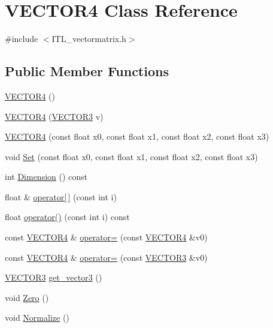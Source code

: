 \hypertarget{classVECTOR4}{
\section{VECTOR4 Class Reference}
\label{classVECTOR4}
}


{\ttfamily \#include $<$ITL\_\-vectormatrix.h$>$}

\subsection*{Public Member Functions}
\begin{DoxyCompactItemize}
\item 
\hyperlink{classVECTOR4_a0fa3ba169814c205b0c415b816efa415}{VECTOR4} ()
\item 
\hyperlink{classVECTOR4_a03f888cfe21db9b688015038a148c2f7}{VECTOR4} (\hyperlink{classVECTOR3}{VECTOR3} v)
\item 
\hyperlink{classVECTOR4_a34f681d3c7082bd127ae8d4445bfc082}{VECTOR4} (const float x0, const float x1, const float x2, const float x3)
\item 
void \hyperlink{classVECTOR4_a7caa8b37c7cd7350c04c66f31fb2d656}{Set} (const float x0, const float x1, const float x2, const float x3)
\item 
int \hyperlink{classVECTOR4_a6a7a49405ccdfcce0d4126f5a70d2514}{Dimension} () const 
\item 
float \& \hyperlink{classVECTOR4_ab1865df5dacd8b2f04a237abf70a57cf}{operator\mbox{[}$\,$\mbox{]}} (const int i)
\item 
float \hyperlink{classVECTOR4_a23c63962e44ac4fbfeca1f3a0d10fea6}{operator()} (const int i) const 
\item 
const \hyperlink{classVECTOR4}{VECTOR4} \& \hyperlink{classVECTOR4_ad3e6ce33ed055090082a2c3793f6a149}{operator=} (const \hyperlink{classVECTOR4}{VECTOR4} \&v0)
\item 
const \hyperlink{classVECTOR4}{VECTOR4} \& \hyperlink{classVECTOR4_aae94c42e8f57dda5b4c1807ed27adfb3}{operator=} (const \hyperlink{classVECTOR3}{VECTOR3} \&v0)
\item 
\hyperlink{classVECTOR3}{VECTOR3} \hyperlink{classVECTOR4_a0a7c6a7c3d28b733666360c12d42a243}{get\_\-vector3} ()
\item 
void \hyperlink{classVECTOR4_ae4abada9a971655104a512e54b7cba2d}{Zero} ()
\item 
void \hyperlink{classVECTOR4_a3273d23451d3389643c05927003c0a8b}{Normalize} ()
\end{DoxyCompactItemize}
